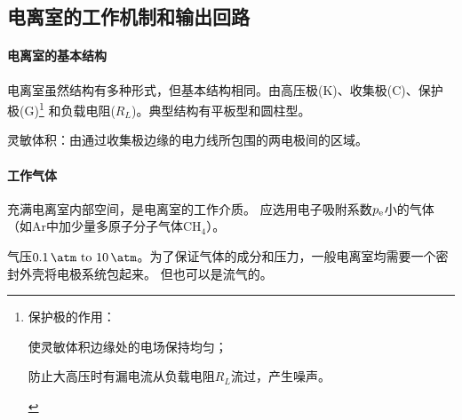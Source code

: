 \subsection{电离室的工作机制和输出回路}
\paragraph{电离室的基本结构}
电离室虽然结构有多种形式，但基本结构相同。由高压极(K)、收集极(C)、保护极(G)\footnote{
	保护极的作用：
	\begin{compactenum}
		\item 使灵敏体积边缘处的电场保持均匀；
		\item 防止大高压时有漏电流从负载电阻$R_L$流过，产生噪声。
	\end{compactenum}
}
和负载电阻($R_L$)。典型结构有平板型和圆柱型。



灵敏体积：由通过收集极边缘的电力线所包围的两电极间的区域。
\paragraph{工作气体}
充满电离室内部空间，是电离室的工作介质。
应选用电子吸附系数$p_\mathrm e$小的气体（如Ar中加少量多原子分子气体CH$_4$）。

气压$\SIrange{0.1}{10}{\atm}$。为了保证气体的成分和压力，一般电离室均需要一个密封外壳将电极系统包起来。
但也可以是流气的。
